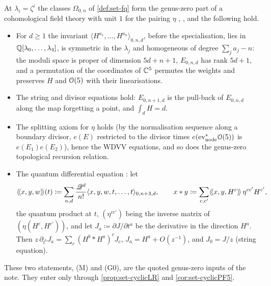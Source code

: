 \begin{thm}
\label{thm:set-G0}
At $\lambda_i=\zeta^i$ the classes $\Omega_{0,n}$ of \cref{def:set-fq} form the genus-zero part of a cohomological field theory with unit $1$ for the pairing $\eta$ \cite[Section~4.1]{GJR18}, \cite[Def.~0.3]{PPZ15}, and the following hold.
\begin{itemize}
\item[(a)] For $d\geq1$ the invariant $\langle H^{a_1},\dots,H^{a_n}\rangle_{0,n,d}$, before the specialisation, lies in $\mathbb{Q}[\lambda_0,\dots,\lambda_4]$, is symmetric in the $\lambda_j$ and homogeneous of degree $\sum_ja_j-n$: the moduli space is proper of dimension $5d+n+1$, $E_{0,n,d}$ has rank $5d+1$, and a permutation of the coordinates of $\mathbb{C}^5$ permutes the weights and preserves $H$ and $\mathcal{O}(5)$ with their linearisations.
\item[(b)] The string and divisor equations hold: $E_{0,n+1,d}$ is the pull-back of $E_{0,n,d}$ along the map forgetting a point, and $\int_dH=d$.
\item[(c)] The splitting axiom for $\eta$ holds (by the normalisation sequence along a boundary divisor, $e(E)$ restricted to the divisor times $e(\mathrm{ev}_{\mathrm{node}}^*\mathcal{O}(5))$ is $e(E_1)e(E_2)$), hence the WDVV equations, and so does the genus-zero topological recursion relation.
\item[(d)] The quantum differential equation \cite[Section~5.2, (14)]{GJR18}: let
\[
\langle\!\langle x,y,w\rangle\!\rangle(t)\coloneqq\sum_{n,d}\frac{\mathscr{Q}^d}{n!}\langle x,y,w,t,\dots,t\rangle_{0,n+3,d},\qquad x*y\coloneqq\sum_{c,c'}\langle\!\langle x,y,H^c\rangle\!\rangle\,\eta^{cc'}H^{c'},
\]
the quantum product at $t$, $(\eta^{cc'})$ being the inverse matrix of $(\eta(H^c,H^{c'}))$, and let $J_a\coloneqq\partial J/\partial t^a$ be the derivative in the direction $H^a$. Then $z\,\partial_{t^b}J_a=\sum_c(H^b*H^a)^cJ_c$, $J_a=H^a+O(z^{-1})$, and $J_0=J/z$ (string equation).
\end{itemize}
\end{thm}

These two statements, (M) and (G0), are the quoted genus-zero inputs of the note. They enter only through \cref{prop:set-cyclicLR} and \cref{cor:set-cyclicPF5}.


